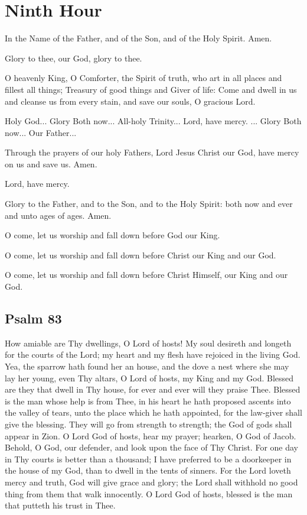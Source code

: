 \section{Ninth Hour}

In the Name of the Father, and of the Son, and of the Holy Spirit. Amen.

Glory to thee, our God, glory to thee.

O heavenly King, O Comforter, the Spirit of truth, who art in all places and fillest all things; Treasury of good things and Giver of life: Come and dwell in us and cleanse us from every stain, and save our souls, O gracious Lord.

Holy God... Glory  Both now... All-holy Trinity... Lord, have mercy. ... Glory  Both now... Our Father...

Through the prayers of our holy Fathers, Lord Jesus Christ our God, have mercy on us and save us. Amen.

Lord, have mercy. 

Glory to the Father, and to the Son, and to the Holy Spirit: both now and ever and unto ages of ages. Amen.

O come, let us worship and fall down before God our King. 

O come, let us worship and fall down before Christ our King and our God. 

O come, let us worship and fall down before Christ Himself, our King and our God. 

\subsection{Psalm 83}

How amiable are Thy dwellings, O Lord of hosts! My soul desireth and longeth for the courts of the Lord; my heart and my flesh have rejoiced in the living God. Yea, the sparrow hath found her an house, and the dove a nest where she may lay her young, even Thy altars, O Lord of hosts, my King and my God. Blessed are they that dwell in Thy house, for ever and ever will they praise Thee. Blessed is the man whose help is from Thee, in his heart he hath proposed ascents into the valley of tears, unto the place which he hath appointed, for the law-giver shall give the blessing. They will go from strength to strength; the God of gods shall appear in Zion. O Lord God of hosts, hear my prayer; hearken, O God of Jacob. Behold, O God, our defender, and look upon the face of Thy Christ. For one day in Thy courts is better than a thousand; I have preferred to be a doorkeeper in the house of my God, than to dwell in the tents of sinners. For the Lord loveth mercy and truth, God will give grace and glory; the Lord shall withhold no good thing from them that walk innocently. O Lord God of hosts, blessed is the man that putteth his trust in Thee.

